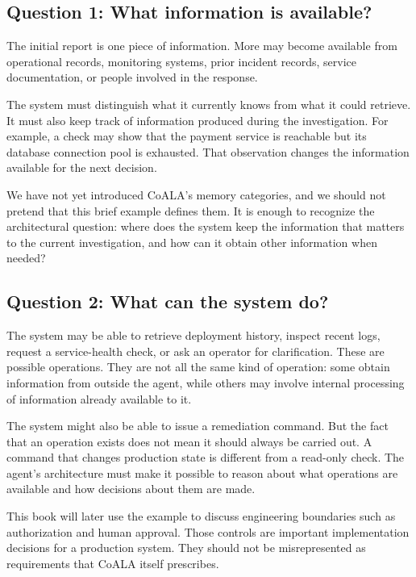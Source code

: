 \subsection{Question 1: What information is available?}\label{question-1-what-information-is-available}

The initial report is one piece of information. More may become available from operational records, monitoring systems, prior incident records, service documentation, or people involved in the response.

The system must distinguish what it currently knows from what it could retrieve. It must also keep track of information produced during the investigation. For example, a check may show that the payment service is reachable but its database connection pool is exhausted. That observation changes the information available for the next decision.

We have not yet introduced CoALA's memory categories, and we should not pretend that this brief example defines them. It is enough to recognize the architectural question: where does the system keep the information that matters to the current investigation, and how can it obtain other information when needed?

\subsection{Question 2: What can the system do?}\label{question-2-what-can-the-system-do}

The system may be able to retrieve deployment history, inspect recent logs, request a service-health check, or ask an operator for clarification. These are possible operations. They are not all the same kind of operation: some obtain information from outside the agent, while others may involve internal processing of information already available to it.

The system might also be able to issue a remediation command. But the fact that an operation exists does not mean it should always be carried out. A command that changes production state is different from a read-only check. The agent's architecture must make it possible to reason about what operations are available and how decisions about them are made.

This book will later use the example to discuss engineering boundaries such as authorization and human approval. Those controls are important implementation decisions for a production system. They should not be misrepresented as requirements that CoALA itself prescribes.

